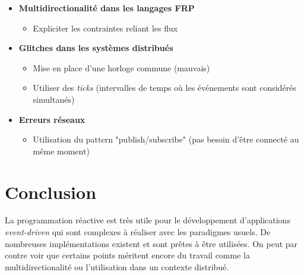 \documentclass[10pt,final]{IEEEtran}
\begin{document}
\begin{itemize}
    \item \textbf{Multidirectionalité dans les langages FRP}
        \begin{itemize}
            \item Expliciter les contraintes reliant les flux 
        \end{itemize}
    \item \textbf{Glitches dans les systèmes distribués}
        \begin{itemize}
            \item Mise en place d'une horloge commune (mauvais)
            \item Utiliser des \textit{ticks} (intervalles de temps où les événements sont considérés simultanés)
        \end{itemize}
    \item \textbf{Erreurs réseaux}
        \begin{itemize}
            \item Utilisation du pattern "publish/subscribe" (pas besoin d'être connecté au même moment)
        \end{itemize}
\end{itemize}

\section{Conclusion}

La programmation réactive est très utile pour le développement d'applications \textit{event-driven} qui sont complexes à réaliser avec les paradigmes usuels. De nombreuses implémentations existent et sont prêtes à être utilisées. On peut par contre voir que certains points méritent encore du travail comme la multidirectionalité ou l'utilisation dans un contexte distribué.
\end{document}
